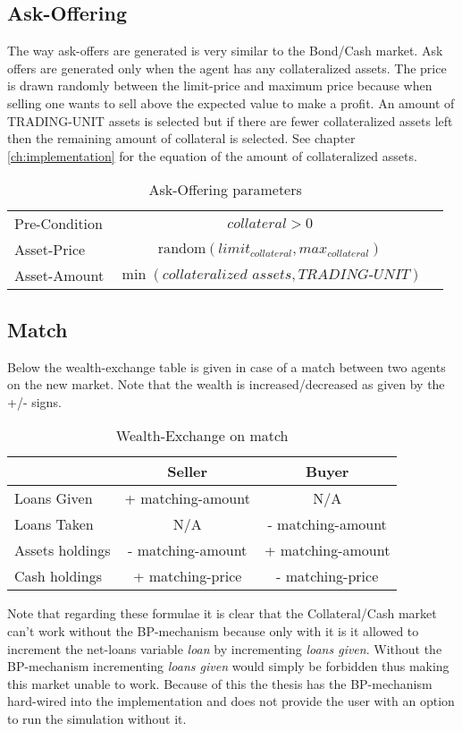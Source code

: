 \documentclass[Bachelorarbeit.tex]{subfiles}
\begin{document}
\subsection{Ask-Offering}
The way ask-offers are generated is very similar to the Bond/Cash market. Ask offers are generated only when the agent has any collateralized assets. The price is drawn randomly between the limit-price and maximum price because when selling one wants to sell above the expected value to make a profit. An amount of TRADING-UNIT assets is selected but if there are fewer collateralized assets left then the remaining amount of collateral is selected. See chapter \ref{ch:implementation} for the equation of the amount of collateralized assets.

\begin{table}[H]
	\centering
	\caption{Ask-Offering parameters}
	\begin{tabular} { l c r }
		\hline
		Pre-Condition & $\textit{collateral} > 0$  \\
		Asset-Price & $\mathrm{random}(limit_{collateral}, max_{collateral})$ \\
		Asset-Amount & $\min ( { \textit{collateralized assets} }, \textit{TRADING-UNIT} )$ \\
		\hline
	\end{tabular}
\end{table}

\subsection{Match}
Below the wealth-exchange table is given in case of a match between two agents on the new market. Note that the wealth is increased/decreased as given by the +/- signs.

\begin{table}[H]
	\centering
	\caption{Wealth-Exchange on match}
	\begin{tabular} { l c c }
		& Seller & Buyer \\
		\hline
		Loans Given & + matching-amount & N/A \\
		Loans Taken & N/A & - matching-amount \\
		Assets holdings & - matching-amount & + matching-amount \\
		Cash holdings  & + matching-price & - matching-price \\
		\hline
	\end{tabular}
\end{table}

Note that regarding these formulae it is clear that the Collateral/Cash market can't work without the BP-mechanism because only with it is it allowed to increment the net-loans variable \textit{loan} by incrementing \textit{loans given}. Without the BP-mechanism incrementing \textit{loans given} would simply be forbidden thus making this market unable to work. Because of this the thesis has the BP-mechanism hard-wired into the implementation and does not provide the user with an option to run the simulation without it.
\end{document}

